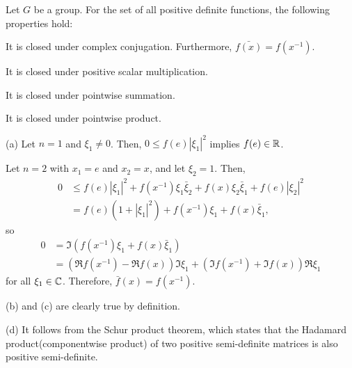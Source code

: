 \documentclass[12pt]{article}
\begin{document}
\begin{prop}
Let $G$ be a group.
For the set of all positive definite functions, the following properties hold:
\begin{parts}
\item It is closed under complex conjugation. Furthermore, $\bar{f(x)}=f(x^{-1})$.
\item It is closed under positive scalar multiplication.
\item It is closed under pointwise summation.
\item It is closed under pointwise product.
\end{parts}
\end{prop}
\begin{pf}
(a)
Let $n=1$ and $\xi_1\ne0$.
Then, $0\le f(e)|\xi_1|^2$ implies $f(e)\in\mathbb{R}$.

Let $n=2$ with $x_1=e$ and $x_2=x$, and let $\xi_2=1$.
Then,
\begin{align*}
0&\le f(e)|\xi_1|^2+f(x^{-1})\xi_1\bar\xi_2+f(x)\xi_2\bar\xi_1+f(e)|\xi_2|^2\\
&=f(e)(1+|\xi_1|^2)+f(x^{-1})\xi_1+f(x)\bar\xi_1,
\end{align*}
so
\begin{align*}
0&=\Im(f(x^{-1})\xi_1+f(x)\bar\xi_1)\\
&=(\Re f(x^{-1})-\Re f(x))\Im\xi_1+(\Im f(x^{-1})+\Im f(x))\Re\xi_1
\end{align*}
for all $\xi_1\in\mathbb{C}$.
Therefore, $\bar f(x)=f(x^{-1})$.

(b) and (c) are clearly true by definition.

(d) It follows from the Schur product theorem, which states that the Hadamard product(componentwise product) of two positive semi-definite matrices is also positive semi-definite.
\end{pf}
\end{document}
